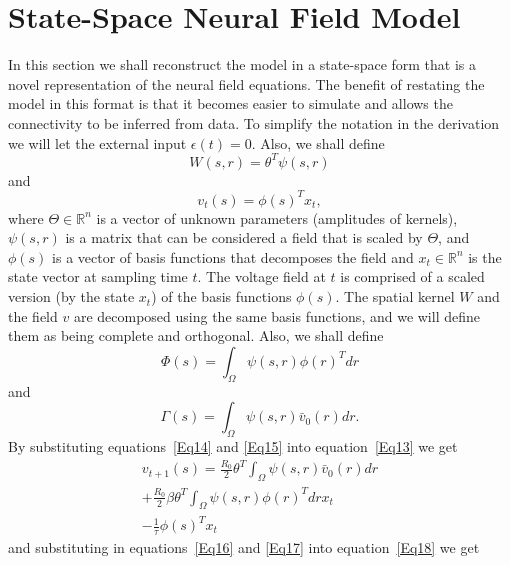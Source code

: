 \documentclass[journal]{IEEEtran}
\begin{document}
\section{State-Space Neural Field Model}
In this section we shall reconstruct the model in a state-space form that is a novel representation of the neural field equations. The benefit of restating the model in this format is that it becomes easier to simulate and allows the connectivity to be inferred from data. To simplify the notation in the derivation we will let the external input $\epsilon(t)=0$. Also, we shall define
\begin{equation}\label{Eq14}
W\left( {s,r} \right) = {\theta ^T}\psi \left( {s,r} \right)
\end{equation}
and
\begin{equation}\label{Eq15}
{v_t}\left( s \right) = \phi {\left( s \right)^T}{x_t},
\end{equation}
where $\Theta \in \mathbb{R}^n$ is a vector of unknown parameters (amplitudes of kernels), $\psi(s,r)$ is a matrix that can be considered a field that is scaled by $\Theta$, and $\phi(s)$ is a vector of basis functions that decomposes the field and $x_t \in\mathbb{R}^n$ is the state vector at sampling time $t$. The voltage field at $t$ is comprised of a scaled version (by the state $x_t$) of the basis functions $\phi(s)$.
 The spatial kernel $W$ and the field $v$ are decomposed using the same basis functions, and we will define them as being complete and orthogonal. Also, we shall define
\begin{equation}\label{Eq16}
\Phi \left( s \right) = \int_\Omega  {\psi \left( {s,r} \right)\phi {{\left( r \right)}^T}dr}
\end{equation}
and
\begin{equation}\label{Eq17}
\Gamma \left( s \right) = \int_\Omega  {\psi \left( {s,r} \right){{\bar v}_0}\left( r \right)dr}.
\end{equation}
By substituting equations~\ref{Eq14} and \ref{Eq15} into equation~\ref{Eq13} we get
\begin{align}\label{Eq18}
 {v_{t + 1}}\left( s \right) = \frac{{{R_0}}}{2}{\theta ^T}\int_\Omega  {\psi \left( {s,r} \right){{\bar v}_0}\left( r \right)dr} \nonumber \\
  + \frac{{{R_0}}}{2}\beta {\theta ^T}\int_\Omega  {\psi \left( {s,r} \right)\phi {{\left( r \right)}^T}dr} {x_t} \\
  - \frac{1}{\tau }\phi {\left( s \right)^T}{x_t} \nonumber
\end{align}
and substituting in equations~\ref{Eq16} and \ref{Eq17} into equation~\ref{Eq18} we get
\end{document}

